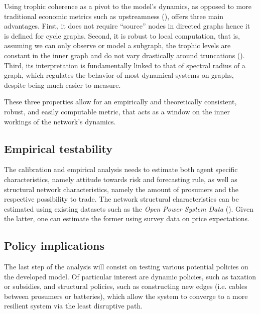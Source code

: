 \documentclass[american]{scrartcl}
\begin{document}
Using trophic coherence as a pivot to the model's dynamics, as opposed to more traditional economic metrics such as upstreamness (\cite{Antrs2012}), offers three main advantages. First, it does not require ``source'' nodes in directed graphs hence it is defined for cycle graphs. Second, it is robust to local computation, that is, assuming we can only observe or model a subgraph, the trophic levels are constant in the inner graph and do not vary drastically around truncations (\cite[p.~19]{MacKay2020}). Third, its interpretation is fundamentally linked to that of spectral radius of a graph, which regulates the behavior of most dynamical systems on graphs, despite being much easier to measure. %

These three properties allow for an empirically and theoretically consistent, robust, and easily computable metric, that acts as a window on the inner workings of the network's dynamics. %


\subsection{Empirical testability}

The calibration and empirical analysis needs to estimate both agent specific characteristics, namely attitude towards risk and forecasting rule, as well as structural network characteristics, namely the amount of prosumers and the respective possibility to trade. The network structural characteristics can be estimated using existing datasets such as the \textit{Open Power System Data} (\cite{Wiese2019}). Given the latter, one can estimate the former using survey data on price expectations.

\subsection{Policy implications}

The last step of the analysis will consist on testing various potential policies on the developed model. Of particular interest are dynamic policies, such as taxation or subsidies, and structural policies, such as constructing new edges (i.e. cables between prosumers or batteries), which allow the system to converge to a more resilient system via the least disruptive path.

\newpage
{} %

\printbibliography
\end{document}
